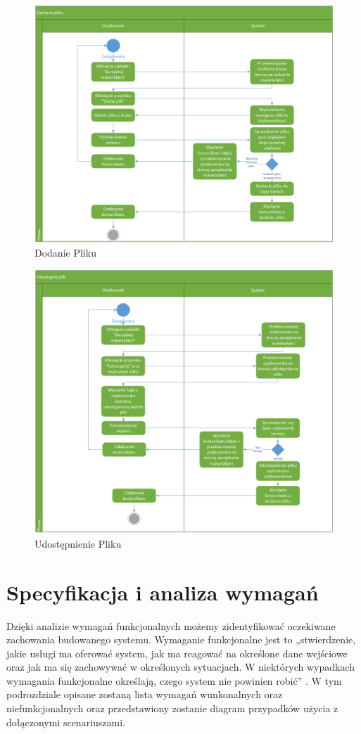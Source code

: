 	\begin{figure}[H]
	\centering
	\includegraphics[scale=0.5]{DodaniePliku}
	\caption{\label{fig:activity_03}Dodanie Pliku}
	\end{figure}
	\begin{figure}[H]
	\centering
	\includegraphics[scale=0.5]{Udostepnienie}
	\caption{\label{fig:activity_04}Udostępnienie Pliku}
	\end{figure}
\section{Specyfikacja i analiza wymagań}
Dzięki analizie wymagań funkcjonalnych możemy zidentyfikować oczekiwane zachowania budowanego systemu. Wymaganie funkcjonalne jest to „stwierdzenie, jakie usługi ma oferować system, jak ma reagować na określone dane wejściowe oraz jak ma się zachowywać w określonych sytuacjach. W niektórych wypadkach wymagania funkcjonalne określają, czego system nie powinien robić” \cite{DOC02}. W tym podrozdziale opisane zostaną lista wymagań wunkonalnych oraz niefunkcjonalnych oraz przedstawiony zostanie diagram przypadków użycia z dołączonymi scenariuszami.
